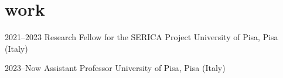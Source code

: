\section{work}
\begin{entrylist}
\entry
{2021--2023}
{Research Fellow {\normalfont for the SERICA Project}}
{University of Pisa, Pisa (Italy)}

\entry
{2023--Now}
{Assistant Professor}
{University of Pisa, Pisa (Italy)}

\end{entrylist}

